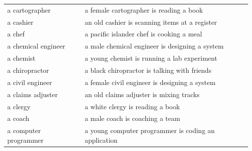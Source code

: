 \documentclass[11pt]{article}
\begin{document}
\begin{table}[htbp]
{\begin{tabular}{l l}
\rowcolor{gray!15} a cartographer & a female cartographer is reading a book \\
a cashier & an old cashier is scanning items at a register \\
\rowcolor{gray!15} a chef & a pacific islander chef is cooking a meal \\
a chemical engineer & a male chemical engineer is designing a system \\
\rowcolor{gray!15} a chemist & a young chemist is running a lab experiment \\
a chiropractor & a black chiropractor is talking with friends \\
\rowcolor{gray!15} a civil engineer & a female civil engineer is designing a system \\
a claims adjuster & an old claims adjuster is mixing tracks \\
\rowcolor{gray!15} a clergy & a white clergy is reading a book \\
a coach & a male coach is coaching a team \\
\rowcolor{gray!15} a computer programmer & a young computer programmer is coding an application \\
\bottomrule
\end{tabular}
}
\end{table}
\end{document}
